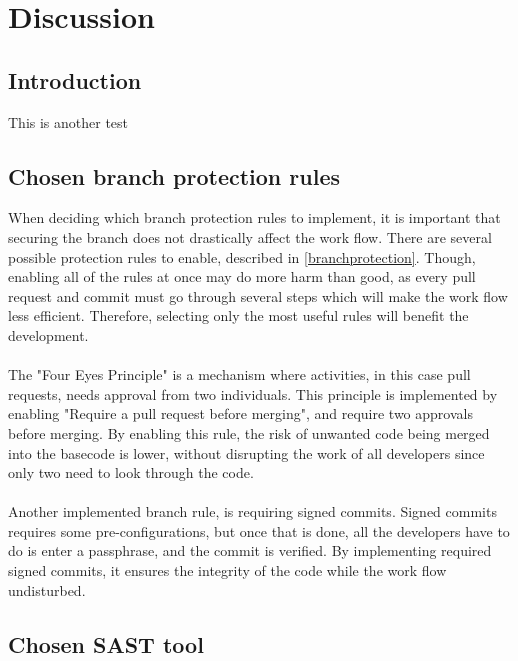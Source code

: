 \chapter{Discussion}
\section{Introduction}
This is another test \cite{nbimattacks}

\section{Chosen branch protection rules}
When deciding which branch protection rules to implement, it is important that securing the branch does not drastically affect the work flow. There are several possible protection rules to enable, described in \ref{branchprotection}. Though, enabling all of the rules at once may do more harm than good, as every pull request and commit must go through several steps which will make the work flow less efficient. Therefore, selecting only the most useful rules will benefit the development. 
\\~\\
The "Four Eyes Principle" is a mechanism where activities, in this case pull requests, needs approval from two individuals.  This principle is implemented by enabling "Require a pull request before merging", and require two approvals before merging. By enabling this rule, the risk of unwanted code being merged into the basecode is lower, without disrupting the work of all developers since only two need to look through the code. \cite{foureyes}
\\~\\
Another implemented branch rule, is requiring signed commits. Signed commits requires some pre-configurations, but once that is done, all the developers have to do is enter a passphrase, and the commit is verified. By implementing required signed commits, it ensures the integrity of the code while the work flow undisturbed.

\section{Chosen SAST tool}